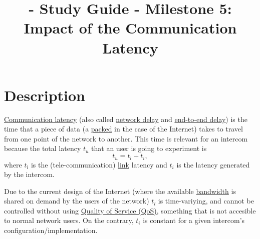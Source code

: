 
\title{\TM - Study Guide - Milestone 5: Impact of the Communication Latency}

\maketitle

\section{Description}

\href{https://en.wikipedia.org/wiki/Latency_(engineering)#Communication_latency}{Communication
  latency} (also called
\href{https://en.wikipedia.org/wiki/Network_delay}{network delay} and
\href{https://en.wikipedia.org/wiki/End-to-end_delay}{end-to-end
  delay}) is the time that a piece of data (a
\href{https://en.wikipedia.org/wiki/Network_packet}{packed} in the
case of the Internet) takes to travel from one point of the network to
another. This time is relevant for an intercom because the total latency $t_u$ that an user is going to experiment is
\begin{equation}
  t_u = t_l + t_i,
  \label{eq:user_latency}
\end{equation}
where $t_l$ is the (tele-communication)
\href{https://en.wikipedia.org/wiki/Telecommunications_link}{link}
latency and $t_i$ is the latency generated by the intercom.

Due to the current design of the Internet (where the available
\href{https://en.wikipedia.org/wiki/Bandwidth_(computing)}{bandwidth}
is shared on demand by the users of the network) $t_l$ is
time-variying, and cannot be controlled without using
\href{https://en.wikipedia.org/wiki/Quality_of_service}{Quality of
  Service (QoS)}, something that is not accesible to normal network
users. On the contrary, $t_i$ is constant for a given intercom's
configuration/implementation.

